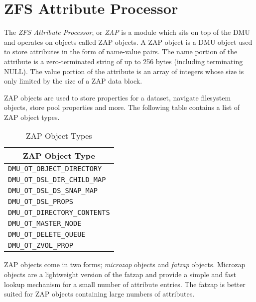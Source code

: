 \chapter{ZFS Attribute Processor}\label{chap:zap}

The \emph{ZFS Attribute Processor}, or \emph{ZAP} is a module
which sits on top of the DMU and operates on objects called ZAP objects.
A ZAP object is a DMU object used to store attributes in the form of name-value pairs.
The name portion of the attribute is a zero-terminated string of up to 256 bytes
(including terminating NULL).
The value portion of the attribute is an array of integers
whose size is only limited by the size of a ZAP data block.

ZAP objects are used to store properties for a dataset,
navigate filesystem objects, store pool properties and more.
The following table contains a list of ZAP object types.

\begin{table}[ht]
  \centering
  \caption{ZAP Object Types}\label{tbl:zap_obj_types}
  \begin{tabular}{l}
    \toprule
    \multicolumn{1}{c}{\textbf{ZAP Object Type}}\\
    \midrule
    \lstinline!DMU_OT_OBJECT_DIRECTORY!\\
    \lstinline!DMU_OT_DSL_DIR_CHILD_MAP!\\
    \lstinline!DMU_OT_DSL_DS_SNAP_MAP!\\
    \lstinline!DMU_OT_DSL_PROPS!\\
    \lstinline!DMU_OT_DIRECTORY_CONTENTS!\\
    \lstinline!DMU_OT_MASTER_NODE!\\
    \lstinline!DMU_OT_DELETE_QUEUE!\\
    \lstinline!DMU_OT_ZVOL_PROP!\\
    \bottomrule
  \end{tabular}
\end{table}

ZAP objects come in two forms; \emph{microzap} objects and \emph{fatzap} objects.
Microzap objects are a lightweight version of the fatzap
and provide a simple and fast lookup mechanism for a small number of attribute entries.
The fatzap is better suited for ZAP objects containing large numbers of attributes.

